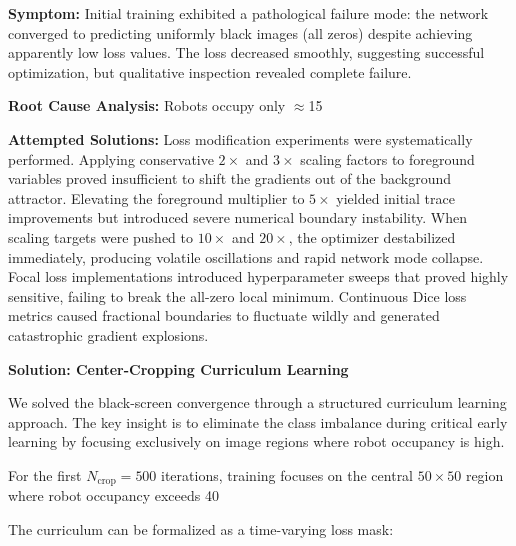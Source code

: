 \documentclass[12pt,a4paper,oneside]{report}
\begin{document}
\textbf{Symptom:} Initial training exhibited a pathological failure mode: the network converged to predicting uniformly black images (all zeros) despite achieving apparently low loss values. The loss decreased smoothly, suggesting successful optimization, but qualitative inspection revealed complete failure.

\textbf{Root Cause Analysis:} Robots occupy only $\approx$15%

\textbf{Attempted Solutions:} Loss modification experiments were systematically performed. Applying conservative $2\times$ and $3\times$ scaling factors to foreground variables proved insufficient to shift the gradients out of the background attractor. Elevating the foreground multiplier to $5\times$ yielded initial trace improvements but introduced severe numerical boundary instability. When scaling targets were pushed to $10\times$ and $20\times$, the optimizer destabilized immediately, producing volatile oscillations and rapid network mode collapse. Focal loss implementations introduced hyperparameter sweeps that proved highly sensitive, failing to break the all-zero local minimum. Continuous Dice loss metrics caused fractional boundaries to fluctuate wildly and generated catastrophic gradient explosions.

\textbf{Solution: Center-Cropping Curriculum Learning}

We solved the black-screen convergence through a structured curriculum learning approach. The key insight is to eliminate the class imbalance during critical early learning by focusing exclusively on image regions where robot occupancy is high.

For the first $N_{\text{crop}} = 500$ iterations, training focuses on the central $50 \times 50$ region where robot occupancy exceeds 40%

The curriculum can be formalized as a time-varying loss mask:
\end{document}
